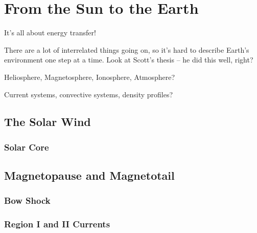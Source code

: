 
\chapter{From the Sun to the Earth}
\label{intro_chapter}

It's all about energy transfer! 

There are a lot of interrelated things going on, so it's hard to describe Earth's environment one step at a time. Look at Scott's thesis -- he did this well, right? 

Heliosphere, Magnetosphere, Ionosphere, Atmosphere?

Current systems, convective systems, density profiles? 



\section{The Solar Wind}

\subsection{Solar Core}

\section{Magnetopause and Magnetotail}

\subsection{Bow Shock}

\subsection{Region I and II Currents}


